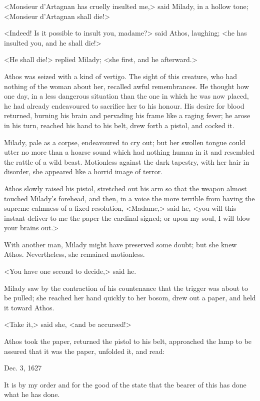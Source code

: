<Monsieur d'Artagnan has cruelly insulted me,> said Milady, in a hollow tone; <Monsieur d'Artagnan shall die!> 

<Indeed! Is it possible to insult you, madame?> said Athos, laughing; <he has insulted you, and he shall die!> 

<He shall die!> replied Milady; <she first, and he afterward.> 

Athos was seized with a kind of vertigo. The sight of this creature, who had nothing of the woman about her, recalled awful remembrances. He thought how one day, in a less dangerous situation than the one in which he was now placed, he had already endeavoured to sacrifice her to his honour. His desire for blood returned, burning his brain and pervading his frame like a raging fever; he arose in his turn, reached his hand to his belt, drew forth a pistol, and cocked it. 

Milady, pale as a corpse, endeavoured to cry out; but her swollen tongue could utter no more than a hoarse sound which had nothing human in it and resembled the rattle of a wild beast. Motionless against the dark tapestry, with her hair in disorder, she appeared like a horrid image of terror. 

Athos slowly raised his pistol, stretched out his arm so that the weapon almost touched Milady's forehead, and then, in a voice the more terrible from having the supreme calmness of a fixed resolution, <Madame,> said he, <you will this instant deliver to me the paper the cardinal signed; or upon my soul, I will blow your brains out.> 

With another man, Milady might have preserved some doubt; but she knew Athos. Nevertheless, she remained motionless. 

<You have one second to decide,> said he. 

Milady saw by the contraction of his countenance that the trigger was about to be pulled; she reached her hand quickly to her bosom, drew out a paper, and held it toward Athos. 

<Take it,> said she, <and be accursed!> 

Athos took the paper, returned the pistol to his belt, approached the lamp to be assured that it was the paper, unfolded it, and read: 

\begin{mail}{Dec. 3, 1627}

It is by my order and for the good of the state that the bearer of this has done what he has done.

\end{mail}

